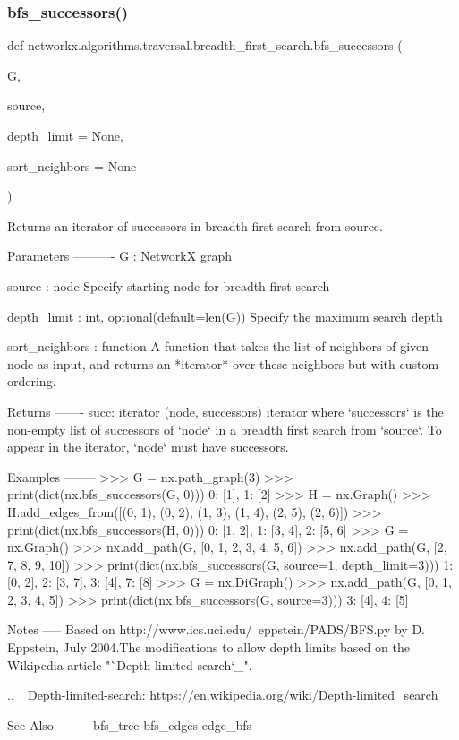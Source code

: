 \subsubsection{\texorpdfstring{bfs\+\_\+successors()}{bfs\_successors()}}
{\footnotesize\ttfamily def networkx.\+algorithms.\+traversal.\+breadth\+\_\+first\+\_\+search.\+bfs\+\_\+successors (\begin{DoxyParamCaption}\item[{}]{G,  }\item[{}]{source,  }\item[{}]{depth\+\_\+limit = {\ttfamily None},  }\item[{}]{sort\+\_\+neighbors = {\ttfamily None} }\end{DoxyParamCaption})}

\begin{DoxyVerb}Returns an iterator of successors in breadth-first-search from source.

Parameters
----------
G : NetworkX graph

source : node
   Specify starting node for breadth-first search

depth_limit : int, optional(default=len(G))
    Specify the maximum search depth

sort_neighbors : function
    A function that takes the list of neighbors of given node as input, and
    returns an *iterator* over these neighbors but with custom ordering.

Returns
-------
succ: iterator
   (node, successors) iterator where `successors` is the non-empty list of
   successors of `node` in a breadth first search from `source`.
   To appear in the iterator, `node` must have successors.

Examples
--------
>>> G = nx.path_graph(3)
>>> print(dict(nx.bfs_successors(G, 0)))
{0: [1], 1: [2]}
>>> H = nx.Graph()
>>> H.add_edges_from([(0, 1), (0, 2), (1, 3), (1, 4), (2, 5), (2, 6)])
>>> print(dict(nx.bfs_successors(H, 0)))
{0: [1, 2], 1: [3, 4], 2: [5, 6]}
>>> G = nx.Graph()
>>> nx.add_path(G, [0, 1, 2, 3, 4, 5, 6])
>>> nx.add_path(G, [2, 7, 8, 9, 10])
>>> print(dict(nx.bfs_successors(G, source=1, depth_limit=3)))
{1: [0, 2], 2: [3, 7], 3: [4], 7: [8]}
>>> G = nx.DiGraph()
>>> nx.add_path(G, [0, 1, 2, 3, 4, 5])
>>> print(dict(nx.bfs_successors(G, source=3)))
{3: [4], 4: [5]}

Notes
-----
Based on http://www.ics.uci.edu/~eppstein/PADS/BFS.py
by D. Eppstein, July 2004.The modifications
to allow depth limits based on the Wikipedia article
"`Depth-limited-search`_".

.. _Depth-limited-search: https://en.wikipedia.org/wiki/Depth-limited_search

See Also
--------
bfs_tree
bfs_edges
edge_bfs
\end{DoxyVerb}
